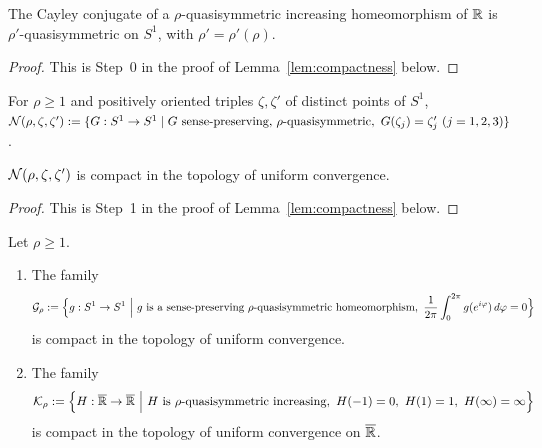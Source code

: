 \begin{lemma}\label{lem:cayleyConj_quasisymmetric}
	The Cayley conjugate of a $\rho$-quasisymmetric increasing homeomorphism of $\mathbb{R}$
	is $\rho'$-quasisymmetric on $S^1$, with $\rho'=\rho'(\rho)$.
\end{lemma}
\begin{proof}
	This is Step~0 in the proof of Lemma~\ref{lem:compactness} below.
\end{proof}

\begin{definition}\label{def:threePointFamily}
	For $\rho\ge1$ and positively oriented triples $\zeta,\zeta'$ of distinct points of
	$S^1$, $\calN(\rho,\zeta,\zeta'):=\{G:S^1\to S^1\mid G\text{ sense-preserving, }
	\rho\text{-quasisymmetric},\ G(\zeta_j)=\zeta_j'\ (j=1,2,3)\}$.
\end{definition}

\begin{lemma}\label{lem:compact_threePointFamily}
	$\mathcal{N}(\rho,\zeta,\zeta')$ is compact in the topology of uniform convergence.
\end{lemma}
\begin{proof}
	This is Step~1 in the proof of Lemma~\ref{lem:compactness} below.
\end{proof}

\begin{lemma}[Compactness]\label{lem:compactness}
	Let $\rho\ge1$.
	\begin{enumerate}
		\item[\rm(a)] The family
		\[
		\calG_\rho:=\Bigl\{g:S^1\to S^1\ \Big|\ g\text{ is a sense-preserving
		}\rho\text{-quasisymmetric homeomorphism},\ \avg{g(e^{i\varphi})}=0\Bigr\}
		\]
		is compact in the topology of uniform convergence.
		\item[\rm(b)] The family
		\[
		\calK_\rho:=\Bigl\{H:\overline{\R}\to\overline{\R}\ \Big|\ H\text{ is
		}\rho\text{-quasisymmetric increasing},\ H(-1)=0,\ H(1)=1,\ H(\infty)=\infty\Bigr\}
		\]
		is compact in the topology of uniform convergence on $\overline{\mathbb{R}}$.
	\end{enumerate}
\end{lemma}

